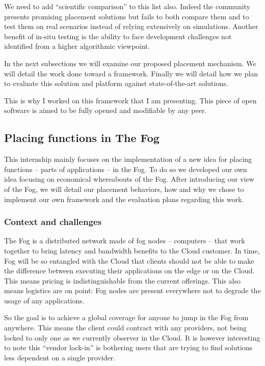 \documentclass[11pt]{sdm}
\begin{document}
We need to add “scientific comparison” to this list also. Indeed the community presents promising placement solutions but fails to both compare them and to test them on real scenarios instead of relying extensively on simulations. Another benefit of in-situ testing is the ability to face development challenges not identified from a higher algorithmic viewpoint.

In the next subsections we will examine our proposed placement mechanism. We will detail the work done toward a framework. Finally we will detail how we plan to evaluate this solution and platform against state-of-the-art solutions.


This is why I worked on this framework that I am presenting. This piece of open software is aimed to be fully opened and modifiable by any peer.

\subsection{Placing functions in The Fog}

This internship mainly focuses on the implementation of a new idea for placing functions – parts of applications – in the Fog. To do so we developed our own idea focusing on economical whereabouts of the Fog. After introducing our view of the Fog, we will detail our placement behaviors, how and why we chose to implement our own framework and the evaluation plans regarding this work.

\subsubsection{Context and challenges}

The Fog is a distributed network made of fog nodes – computers – that work together to bring latency and bandwidth benefits to the Cloud customer. In time, Fog will be so entangled with the Cloud that clients should not be able to make the difference between executing their applications on the edge or on the Cloud. This means pricing is indistinguishable from the current offerings. This also means logistics are on point: Fog nodes are present everywhere not to degrade the usage of any applications.

So the goal is to achieve a global coverage for anyone to jump in the Fog from anywhere. This means the client could contract with any providers, not being locked to only one as we currently observer in the Cloud. It is however interesting to note this “vendor lock-in” is bothering users that are trying to find solutions less dependent on a single provider.
\end{document}
